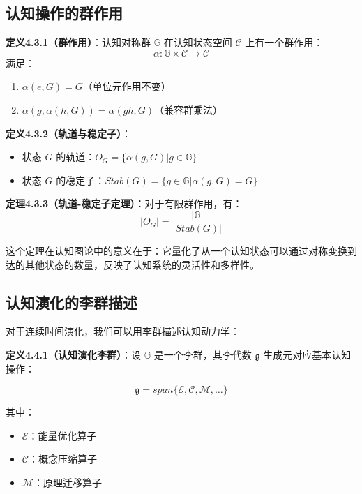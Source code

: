 \documentclass[12pt,a4paper]{article}
\newcommand{\cognitivespace}{\mathcal{C}}
\newcommand{\cognitivegroup}{\mathbb{G}}
\newcommand{\energyoperator}{\mathcal{E}}
\newcommand{\compressionoperator}{\mathcal{C}}
\newcommand{\migrationoperator}{\mathcal{M}}
\begin{document}
\subsection{认知操作的群作用}

\textbf{定义4.3.1（群作用）}：认知对称群 $\cognitivegroup$ 在认知状态空间 $\cognitivespace$ 上有一个群作用：
\begin{equation}
\alpha: \cognitivegroup \times \cognitivespace \rightarrow \cognitivespace
\end{equation}
满足：
\begin{enumerate}
\item $\alpha(e, G) = G$（单位元作用不变）
\item $\alpha(g, \alpha(h, G)) = \alpha(gh, G)$（兼容群乘法）
\end{enumerate}

\textbf{定义4.3.2（轨道与稳定子）}：
\begin{itemize}
\item 状态 $G$ 的轨道：$O_G = \{\alpha(g, G) | g \in \cognitivegroup\}$
\item 状态 $G$ 的稳定子：$Stab(G) = \{g \in \cognitivegroup | \alpha(g, G) = G\}$
\end{itemize}

\textbf{定理4.3.3（轨道-稳定子定理）}：对于有限群作用，有：
\begin{equation}
|O_G| = \frac{|\cognitivegroup|}{|Stab(G)|}
\end{equation}

这个定理在认知图论中的意义在于：它量化了从一个认知状态可以通过对称变换到达的其他状态的数量，反映了认知系统的灵活性和多样性。

\subsection{认知演化的李群描述}

对于连续时间演化，我们可以用李群描述认知动力学：

\textbf{定义4.4.1（认知演化李群）}：设 $\cognitivegroup$ 是一个李群，其李代数 $\mathfrak{g}$ 生成元对应基本认知操作：

\begin{equation}
\mathfrak{g} = span\{\energyoperator, \compressionoperator, \migrationoperator, \ldots\}
\end{equation}

其中：
\begin{itemize}
\item $\energyoperator$：能量优化算子
\item $\compressionoperator$：概念压缩算子  
\item $\migrationoperator$：原理迁移算子
\end{itemize}
\end{document}
